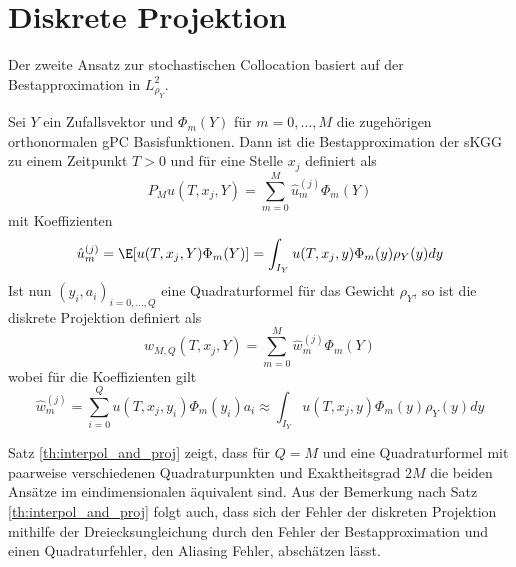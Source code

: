 \section{Diskrete Projektion}
Der zweite Ansatz zur stochastischen Collocation basiert auf der Bestapproximation in $L_{\rho_Y}^2$.
\begin{mathdef}
Sei $Y$ ein Zufallsvektor und $\Phi_m(Y)$ für $m=0,\dots,M$ die zugehörigen orthonormalen gPC Basisfunktionen. Dann ist die Bestapproximation der sKGG zu einem Zeitpunkt $T>0$ und für eine Stelle $x_j$ definiert als
\[P_Mu(T,x_j,Y)=\sum_{m=0}^M\hat{u}_m^{(j)}\Phi_m(Y)\]
mit Koeffizienten
\[\hat{u}_m^{(j)}=\E[u(T,x_j,Y)\Phi_m(Y)]=\int_{I_Y} u(T,x_j,y)\Phi_m(y)\rho_Y(y)dy\]
Ist nun $(y_i,a_i)_{i=0,\dots,Q}$ eine Quadraturformel für das Gewicht $\rho_Y$, so ist die diskrete Projektion definiert als
\[w_{M,Q}(T,x_j,Y)=\sum_{m=0}^M\hat{w}_m^{(j)}\Phi_m(Y)\] wobei für die Koeffizienten gilt
\[\hat{w}_m^{(j)}=\sum_{i=0}^Qu(T,x_j,y_i)\Phi_m(y_i)a_i\approx \int_{I_Y} u(T,x_j,y)\Phi_m(y)\rho_Y(y)dy\]
\end{mathdef}
Satz \ref{th:interpol_and_proj} zeigt, dass für $Q=M$ und eine Quadraturformel mit paarweise verschiedenen Quadraturpunkten und Exaktheitsgrad $2M$ die beiden Ansätze im eindimensionalen äquivalent sind. Aus der Bemerkung nach Satz \ref{th:interpol_and_proj} folgt auch, dass sich der Fehler der diskreten Projektion mithilfe der Dreiecksungleichung durch den Fehler der Bestapproximation und einen Quadraturfehler, den Aliasing Fehler, abschätzen lässt.


